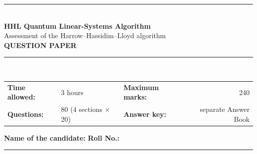 \documentclass[11pt,a4paper]{article}
\begin{document}
\pagestyle{fancy}\fancyhf{}
\renewcommand{\headrulewidth}{0.4pt}

\thispagestyle{empty}
\begin{center}
{\color{brand}\rule{\linewidth}{1.2pt}}\\[6pt]
{\Huge\bfseries\color{brand} HHL Quantum Linear-Systems Algorithm}\\[4pt]
{\Large Assessment of the Harrow--Hassidim--Lloyd algorithm}\\[4pt]
{\large\bfseries QUESTION PAPER}\\[2pt]
{\color{brand}\rule{\linewidth}{1.2pt}}\\[1pt]
\end{center}
\vspace{-2pt}
\begin{tabularx}{\linewidth}{@{}lXlr@{}}
\textbf{Time allowed:} & 3 hours & \textbf{Maximum marks:} & 240\\
\textbf{Questions:} & 80 (4 sections $\times$ 20) & \textbf{Answer key:} & separate Answer Book
\end{tabularx}
\vspace{6pt}

\textbf{Name of the candidate:} \hrulefill\quad \textbf{Roll No.:} \rule{35mm}{0.4pt}
\end{document}

